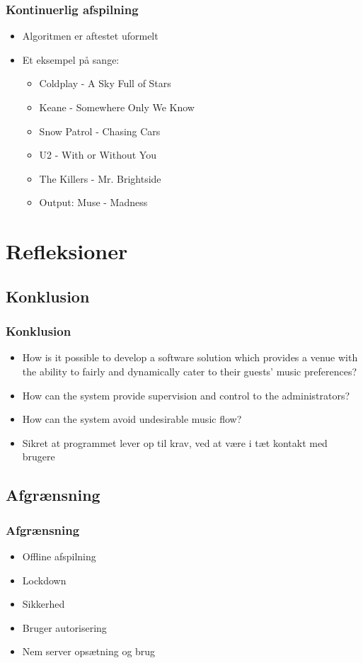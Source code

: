 \begin{frame}
	\frametitle{Kontinuerlig afspilning}
	\begin{itemize}
		\item Algoritmen er aftestet uformelt
		\item Et eksempel på sange:
		\begin{itemize}
		\item Coldplay - A Sky Full of Stars
		\item Keane - Somewhere Only We Know
		\item Snow Patrol - Chasing Cars
		\item U2 - With or Without You
		\item The Killers - Mr. Brightside 
		\item Output: Muse - Madness
		\end{itemize}
	\end{itemize}
\end{frame}



\section{Refleksioner}
\subsection{Konklusion}

\begin{frame}
	\frametitle{Konklusion}
	\begin{itemize}
		\item How is it possible to develop a software solution which provides a venue with the ability to fairly and dynamically cater to their guests’ music preferences?
		\item How can the system provide supervision and control to the administrators?
		\item How can the system avoid undesirable music flow?
		\item Sikret at programmet lever op til krav, ved at være i tæt kontakt med brugere
	\end{itemize}
\end{frame}
\subsection{Afgrænsning}

\begin{frame}
	\frametitle{Afgrænsning}
	\begin{itemize}
		\item Offline afspilning
		\item Lockdown
		\item Sikkerhed
		\item Bruger autorisering
		\item Nem server opsætning og brug
	\end{itemize}
\end{frame}
